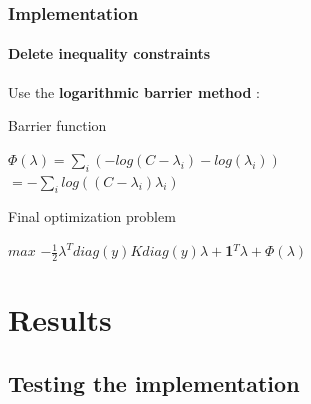 \documentclass{beamer}
\begin{document}
\begin{frame}
\frametitle{Implementation}
\framesubtitle{Delete inequality constraints}

Use the \textbf{logarithmic barrier method} :

\pause

\begin{block}{Barrier function}
          \begin{center}
          $\Phi(\lambda) = \sum_i (- log(C - \lambda_i) - log(\lambda_i))$\\
          $= - \sum_i log((C - \lambda_i)\lambda_i)$ 
          \end{center}
\end{block}

\pause

\begin{alertblock}{Final optimization problem}
          \begin{center}
          $max$ $-\frac{1}{2}\lambda^Tdiag(y)Kdiag(y)\lambda+$\textbf{1}$^T\lambda + \Phi(\lambda)$\\ 
          \end{center}
\end{alertblock}

\end{frame}

\section{Results}

\subsection{Testing the implementation}

\begin{frame}
\tableofcontents[currentsubsection]
\end{frame}
\end{document}
